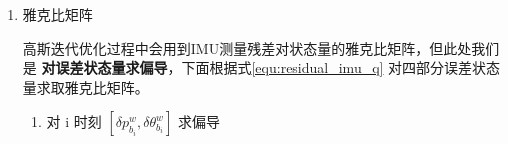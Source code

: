 \documentclass[12pt,a4paper]{article}
\begin{document}
\begin{enumerate}
\begin{lstlisting}
Eigen::Matrix<double, 15, 15> cov_inv = pre_integration->covariance.inverse();
Eigen::Matrix<double, 15, 15> sqrt_info =
    Eigen::LLT<Eigen::Matrix<double, 15, 15>>(cov_inv).matrixL().transpose();

residual = sqrt_info * residual; 
\end{lstlisting}

这里残差 \verb|residual| 乘以 \verb|sqrt_info|，是因为真正的优化项其实是 Mahalanobis 距离 或 马氏范数

\begin{equation}
\|\mathbf{r}\|^2_{\boldsymbol{\Sigma}} = \mathbf{r}^T \boldsymbol{\Sigma}^{-1} \mathbf{r}
\end{equation}

Mahalanobis距离 其实相当于一个残差加权，协方差大的加权小，协方差小的加权大，着重优化那些比较确定的残差。  

Ceres-Solver只接受最小二乘优化，即 $\min \|\mathbf{r}\|^2$，通过Cholesky分解，\textbf{将马氏范数转化为二范数}

\begin{equation}
\|\mathbf{r}\|^2_{\boldsymbol{\Sigma}} 
= 
\mathbf{r}^T \boldsymbol{\Sigma}^{-1} \mathbf{r}
=
\mathbf{r}^T (\mathbf{L} \mathbf{L}^T) \mathbf{r}
=
(\mathbf{L}^T \mathbf{r})^T (\mathbf{L}^T \mathbf{r})
=
\|\mathbf{L}^T \mathbf{r}\|^2
\end{equation}

令 $\mathbf{r'} = (\mathbf{L}^T \mathbf{r})$ 作为新的优化误差，所以 

\begin{equation}
\text{sqrt\_info} = \mathbf{L}^T
\end{equation}

\item 雅克比矩阵

高斯迭代优化过程中会用到IMU测量残差对状态量的雅克比矩阵，但此处我们是 \textbf{对误差状态量求偏导}，下面根据式\eqref{equ:residual_imu_q} 对四部分误差状态量求取雅克比矩阵。

\begin{enumerate}

\item 对 {\color{blue}i 时刻 $[\delta p^{w}_{b_{i}},\delta \theta ^{w}_{b_{i}}]$} 求偏导


\end{enumerate}
\end{enumerate}
\end{document}
